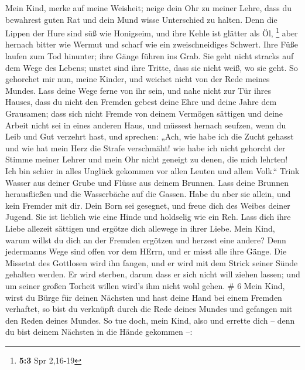  Mein Kind, merke auf meine Weisheit; neige dein Ohr zu
meiner Lehre,  dass du bewahrest guten Rat und dein Mund
wisse Unterschied zu halten.  Denn die Lippen der Hure sind
süß wie Honigseim, und ihre Kehle ist glätter als Öl, \footnote{\textbf{5:3}
  Spr 2,16-19}  aber hernach bitter wie Wermut und scharf
wie ein zweischneidiges Schwert.  Ihre Füße laufen zum Tod
hinunter; ihre Gänge führen ins Grab.  Sie geht nicht
stracks auf dem Wege des Lebens; unstet sind ihre Tritte, dass sie nicht
weiß, wo sie geht.  So gehorchet mir nun, meine Kinder, und
weichet nicht von der Rede meines Mundes.  Lass deine Wege
ferne von ihr sein, und nahe nicht zur Tür ihres Hauses, 
dass du nicht den Fremden gebest deine Ehre und deine Jahre dem
Grausamen;  dass sich nicht Fremde von deinem Vermögen
sättigen und deine Arbeit nicht sei in eines anderen Haus, 
und müssest hernach seufzen, wenn du Leib und Gut verzehrt hast,
 und sprechen: „Ach, wie habe ich die Zucht gehasst und wie
hat mein Herz die Strafe verschmäht!  wie habe ich nicht
gehorcht der Stimme meiner Lehrer und mein Ohr nicht geneigt zu denen,
die mich lehrten!  Ich bin schier in alles Unglück gekommen
vor allen Leuten und allem Volk.``  Trink Wasser aus deiner
Grube und Flüsse aus deinem Brunnen.  Lass deine Brunnen
herausfließen und die Wasserbäche auf die Gassen.  Habe du
aber sie allein, und kein Fremder mit dir.  Dein Born sei
gesegnet, und freue dich des Weibes deiner Jugend.  Sie ist
lieblich wie eine Hinde und holdselig wie ein Reh. Lass dich ihre Liebe
allezeit sättigen und ergötze dich allewege in ihrer Liebe.
 Mein Kind, warum willst du dich an der Fremden ergötzen
und herzest eine andere?  Denn jedermanns Wege sind offen
vor dem HErrn, und er misst alle ihre Gänge.  Die Missetat
des Gottlosen wird ihn fangen, und er wird mit dem Strick seiner Sünde
gehalten werden.  Er wird sterben, darum dass er sich nicht
will ziehen lassen; und um seiner großen Torheit willen wird's ihm nicht
wohl gehen. \# 6  Mein Kind, wirst du Bürge für deinen
Nächsten und hast deine Hand bei einem Fremden verhaftet, 
so bist du verknüpft durch die Rede deines Mundes und gefangen mit den
Reden deines Mundes.  So tue doch, mein Kind, also und
errette dich -- denn du bist deinem Nächsten in die Hände gekommen --:

